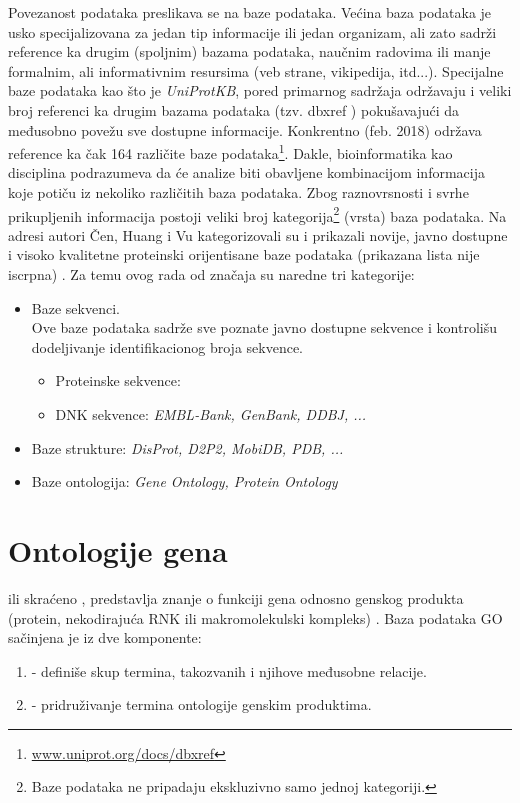 Povezanost podataka preslikava se na baze podataka. Većina baza podataka je usko
specijalizovana za jedan tip informacije ili jedan organizam, ali zato sadrži
reference ka drugim (spoljnim) bazama podataka, naučnim radovima ili  manje formalnim,
ali informativnim resursima (veb strane, vikipedija, itd...). Specijalne baze
podataka kao što je \textit{UniProtKB}, pored primarnog sadržaja održavaju i veliki
broj referenci ka drugim bazama podataka (tzv. dbxref ) pokušavajući da međusobno povežu sve dostupne informacije.
Konkrentno \uniprotkb (feb. 2018) održava reference ka čak 164 različite baze
podataka\footnote{\url{www.uniprot.org/docs/dbxref}}.  Dakle, bioinformatika
kao disciplina podrazumeva da će analize biti obavljene kombinacijom
informacija koje potiču iz nekoliko različitih baza podataka.  Zbog
raznovrsnosti i svrhe prikupljenih informacija postoji veliki broj
kategorija\footnote{Baze podataka ne pripadaju ekskluzivno samo jednoj
kategoriji.} (vrsta) baza podataka. Na adresi \cite{dbSummary2015} autori Čen, Huang i
Vu kategorizovali su i prikazali novije, javno dostupne i visoko kvalitetne
proteinski orijentisane baze podataka (prikazana lista nije iscrpna)
\parencite{Chen2017}.  Za temu ovog rada od značaja su naredne tri kategorije:

\begin{itemize}
  \item Baze sekvenci.\\ 
        Ove baze podataka sadrže sve poznate javno dostupne sekvence i kontrolišu dodeljivanje 
        identifikacionog broja sekvence.
    \begin{itemize}
      \item Proteinske sekvence: \uniprotkb
      \item DNK sekvence: \textit{EMBL-Bank, GenBank, DDBJ, ...}
    \end{itemize}
  \item Baze strukture: \textit{DisProt, D2P2, MobiDB, PDB, ...}
  \item Baze ontologija: \textit{Gene Ontology, Protein Ontology}
\end{itemize}


\section{Ontologije gena}
\label{GO}

  ili skraćeno ,
predstavlja znanje o funkciji gena odnosno genskog produkta (protein,
nekodirajuća RNK ili makromolekulski kompleks)
\parencite{GO2016}.
Baza podataka GO sačinjena je iz dve komponente:
\begin{enumerate}
  \item {} - definiše skup termina, takozvanih
      i njihove međusobne relacije.
  \item {} - pridruživanje termina ontologije genskim produktima.
\end{enumerate}

